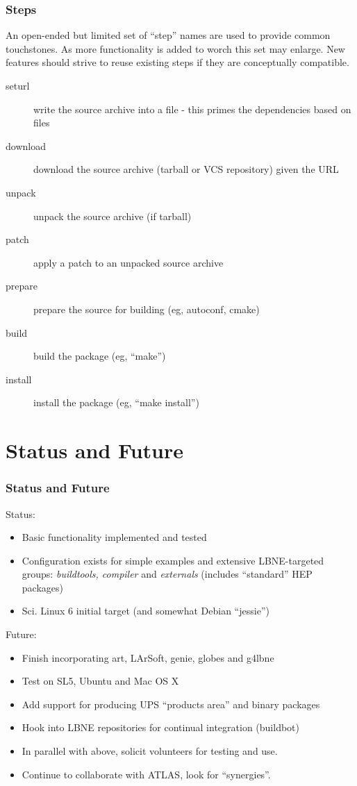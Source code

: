 \documentclass[xcolor=dvipsnames]{beamer}
\begin{document}
\begin{frame}
  \frametitle{Steps}

  An open-ended but limited set of ``step'' names are used to provide
  common touchstones.  As more functionality is added to worch this
  set may enlarge.  New features should strive to reuse existing steps
  if they are conceptually compatible.
  \begin{description}
  \item[seturl] write the source archive into a file - this primes the dependencies based on files
  \item[download] download the source archive (tarball or VCS repository) given the URL
  \item[unpack] unpack the source archive (if tarball)
  \item[patch] apply a patch to an unpacked source archive
  \item[prepare] prepare the source for building (eg, autoconf, cmake)
  \item[build] build the package (eg, ``make'')
  \item[install] install the package (eg, ``make install'')
  \end{description}

\end{frame}

\section{Status and Future}

\begin{frame}
  \frametitle{Status and Future}
  Status:
  \begin{itemize}
  \item Basic functionality implemented and tested
  \item Configuration exists for simple examples and extensive
    LBNE-targeted groups: \textit{buildtools, compiler} and
    \textit{externals} (includes ``standard'' HEP packages)
  \item Sci. Linux 6 initial target (and somewhat Debian ``jessie'')
  \end{itemize}
  Future:
  \begin{itemize}
  \item Finish incorporating art, LArSoft, genie, globes and g4lbne
  \item Test on SL5, Ubuntu and Mac OS X
  \item Add support for producing UPS ``products area'' and binary packages
  \item Hook into LBNE repositories for continual integration (buildbot)
  \item In parallel with above, solicit volunteers for testing and use.
  \item Continue to collaborate with ATLAS, look for ``synergies''.
  \end{itemize}
\end{frame}
\end{document}
